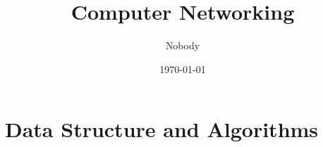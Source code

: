 \documentclass{mynote}
\title{Computer Networking}
\author{Nobody}
\date{\today}
\begin{document}
\makemytitle
% 
\part{Data Structure and Algorithms}



% 
\end{document}
